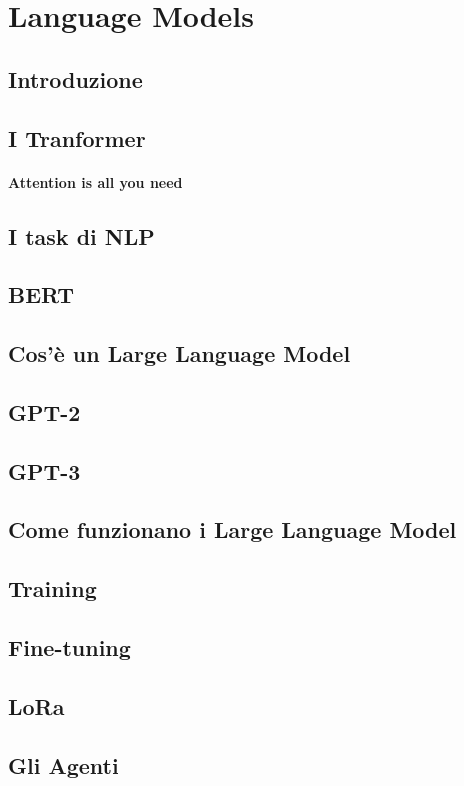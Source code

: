 \chapter{Language Models}\label{Language_Models}
\section{Introduzione}
\section{I Tranformer}
\subsubsection[Attention is all you need]{Attention is all you need}
\section{I task di NLP}
\section{BERT}
\section{Cos'è un Large Language Model}
\section{GPT-2}
\section{GPT-3}
\section{Come funzionano i Large Language Model}
\section{Training}
\section{Fine-tuning}
\section{LoRa}
\section{Gli Agenti}